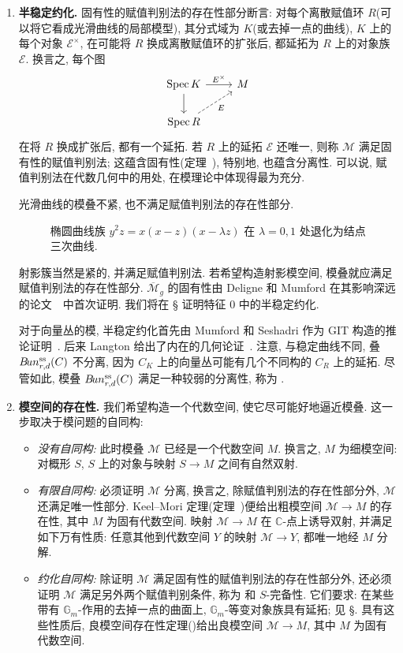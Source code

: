 \begin{enumerate}[步骤 1: ]
\item\textbf{半稳定约化.} 固有性的赋值判别法的存在性部分断言: 对每个离散赋值环 $R$(可以将它看成光滑曲线的局部模型), 其分式域为 $K$(或去掉一点的曲线), $K$ 上的每个对象 $\mathcal E^\times$, 在可能将 $R$ 换成离散赋值环的扩张后, 都延拓为 $R$ 上的对象族 $\mathcal E$. 换言之, 每个图
\begin{equation}\label{src:1.7.2}
\begin{tikzcd}
\operatorname{Spec}K\arrow[r,"\mathcal E^\times"]\arrow[d] & \mathcal M\\
\operatorname{Spec}R\arrow[ur,dashed,"\mathcal E"'] &
\end{tikzcd}
\end{equation}
在将 $R$ 换成扩张后, 都有一个延拓. 若 $R$ 上的延拓 $\mathcal E$ 还唯一, 则称 $\mathcal M$ 满足固有性的赋值判别法; 这蕴含固有性(定理~), 特别地, 也蕴含分离性. 可以说, 赋值判别法在代数几何中的用处, 在模理论中体现得最为充分.

光滑曲线的模叠不紧, 也不满足赋值判别法的存在性部分.
\begin{figure}[H]
\centering
\caption{椭圆曲线族 $y^2z=x(x-z)(x-\lambda z)$ 在 $\lambda=0,1$ 处退化为结点三次曲线.}\label{src:1.7.3}
\end{figure}
射影簇当然是紧的, 并满足赋值判别法. 若希望构造射影模空间, 模叠就应满足赋值判别法的存在性部分. $\overline{\mathcal M}_g$ 的固有性由 Deligne 和 Mumford 在其影响深远的论文~\cite{DM69}~中首次证明. 我们将在 \S{} 证明特征 $0$ 中的半稳定约化.

对于向量丛的模, 半稳定约化首先由 Mumford 和 Seshadri 作为 GIT 构造的推论证明~\cite{Ses67}. 后来 Langton 给出了内在的几何论证~\cite{Lan75}. 注意, 与稳定曲线不同, 叠 $B\!un_{r,d}^{\mathrm{ss}}(C)$ 不分离, 因为 $C_K$ 上的向量丛可能有几个不同构的 $C_R$ 上的延拓. 尽管如此, 模叠 $B\!un_{r,d}^{\mathrm{ss}}(C)$ 满足一种较弱的分离性, 称为 .

\item\textbf{模空间的存在性.} 我们希望构造一个代数空间, 使它尽可能好地逼近模叠. 这一步取决于模问题的自同构: 
\begin{itemize}
\item \textit{没有自同构: }此时模叠 $\mathcal M$ 已经是一个代数空间 $M$. 换言之, $M$ 为细模空间: 对概形 $S$, $S$ 上的对象与映射 $S\to M$ 之间有自然双射.
\item \textit{有限自同构: }必须证明 $\mathcal M$ 分离, 换言之, 除赋值判别法的存在性部分外, $\mathcal M$ 还满足唯一性部分. Keel--Mori 定理(定理~)便给出粗模空间 $\mathcal M\to M$ 的存在性, 其中 $M$ 为固有代数空间. 映射 $\mathcal M\to M$ 在 $\mathbb C$-点上诱导双射, 并满足如下万有性质: 任意其他到代数空间 $Y$ 的映射 $\mathcal M\to Y$, 都唯一地经 $M$ 分解.
\item \textit{约化自同构: }除证明 $\mathcal M$ 满足固有性的赋值判别法的存在性部分外, 还必须证明 $\mathcal M$ 满足另外两个赋值判别条件, 称为 和 $S$-完备性. 它们要求: 在某些带有 $\mathbb G_m$-作用的去掉一点的曲面上, $\mathbb G_m$-等变对象族具有延拓; 见 \S{}. 具有这些性质后, 良模空间存在性定理()给出良模空间 $\mathcal M\to M$, 其中 $M$ 为固有代数空间.


\end{itemize}
\end{enumerate}
